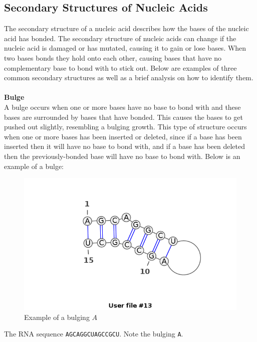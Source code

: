 \subsection{Secondary Structures of Nucleic Acids}\label{structs}
The secondary structure of a nucleic acid describes how the bases of the 
nucleic acid has bonded. The secondary structure of nucleic acids can change if 
the nucleic acid is damaged or has mutated, causing it to gain or lose 
bases. When two bases bonds they hold onto each other, causing bases that 
have no complementary base to bond with to stick out. Below are examples of three 
common secondary structures as well as a brief analysis on how to identify them.\\\\
\textbf{Bulge}\\ 
A bulge occurs when one or more bases have no base to bond with and these 
bases are surrounded by bases that have bonded. This causes the bases to get 
pushed out slightly, resembling a bulging growth. This type of structure occurs 
when one or more bases has been inserted or deleted, since if a base has been 
inserted then it will have no base to bond with, and if a base has been deleted 
then the previously-bonded base will have no base to bond with. 
Below is an example of a bulge:
\begin{myex}\centering
\begin{figure}[h!]
\centering
\includegraphics[scale=0.4]{./lib/bulge.png}
\caption{Example of a bulging $A$}%
\end{figure}
The RNA sequence {\tt AGCAGGCUAGCCGCU}. Note the bulging {\tt A}.
\end{myex}
